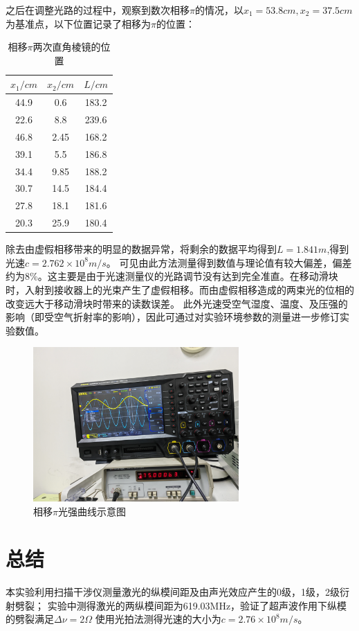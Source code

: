 \documentclass[12pt,a4paper]{article}
\begin{document}
之后在调整光路的过程中，观察到数次相移$\pi$的情况，以$x_1=53.8cm,x_2=37.5cm$为基准点，以下位置记录了相移为$\pi$的位置：
\begin{table}[H]
    \centering
    \begin{tabular}{|c|c|c|}
    \hline
    $x_1/cm$   & $x_2/cm$   & $L/cm$     \\ \hline
    44.9 & 0.6  & 183.2 \\ \hline
    22.6 & 8.8  & 239.6 \\ \hline
    46.8 & 2.45 & 168.2 \\ \hline
    39.1 & 5.5  & 186.8 \\ \hline
    34.4 & 9.85 & 188.2 \\ \hline
    30.7 & 14.5 & 184.4 \\ \hline
    27.8 & 18.1 & 181.6 \\ \hline
    20.3 & 25.9 & 180.4 \\ \hline
    \end{tabular}
    \caption{相移$\pi$两次直角棱镜的位置}
    \end{table}
    除去由虚假相移带来的明显的数据异常，将剩余的数据平均得到$L=1.841m$,得到光速$c=2.762\times 10^8m/s$。
    可见由此方法测量得到数值与理论值有较大偏差，偏差约为8\%。这主要是由于光速测量仪的光路调节没有达到完全准直。在移动滑块时，入射到接收器上的光束产生了虚假相移。而由虚假相移造成的两束光的位相的改变远大于移动滑块时带来的读数误差。
    此外光速受空气湿度、温度、及压强的影响（即受空气折射率的影响），因此可通过对实验环境参数的测量进一步修订实验数值。
    \begin{figure}[H]
        \centering
        \includegraphics[width=0.7\textwidth]{2.jpg}
        \caption{相移$\pi$光强曲线示意图}
    \end{figure}
\section{总结}
本实验利用扫描干涉仪测量激光的纵模间距及由声光效应产生的0级，1级，2级衍射劈裂；
实验中测得激光的两纵模间距为619.03MHz，验证了超声波作用下纵模的劈裂满足$\Delta \nu=2\Omega$
使用光拍法测得光速的大小为$c=2.76\times 10^8m/s$。
\end{document}
